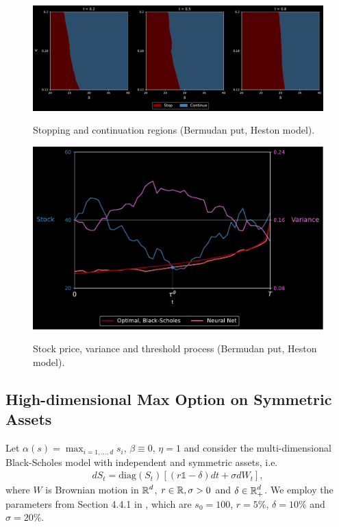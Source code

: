 \begin{figure}[t]
    \centering
     \caption{Stopping and continuation regions (Bermudan put, Heston model).}
    \includegraphics[scale = 0.42]{Figures/2DPlotHestonWide.pdf}
    \label{fig:heston1}
\end{figure}


\begin{figure}[t]
    \centering
     \caption{Stock price, variance and threshold process (Bermudan put, Heston model).}
    \includegraphics[scale = 0.42]{Figures/BdryHeston2.pdf}
    \label{fig:heston2}
\end{figure}


\subsection{High-dimensional Max Option on Symmetric Assets}\label{sec:maxCallSym}
Let $\alpha(s) = \max_{i=1,...,d}s_i$, $\beta\equiv 0$, $\eta=1$ and consider the multi-dimensional Black-Scholes model with independent and symmetric assets, i.e. 
\begin{align}\label{eq:BSAsym}
    d S_t = \text{diag}(S_t) \left[ (r\mathds{1} - \delta)dt + \sigma dW_t\right],
\end{align}
where $W$ is Brownian motion in $\operatorname{\mathbb{R}}^d$, $r \in \operatorname{\mathbb{R}} ,\sigma > 0$ and $\delta \in \operatorname{\mathbb{R}}_+^d$. We employ the parameters from Section 4.4.1 in \cite{Becker2}, which are $s_0 =100 $, $r=5\%$, $\delta =10\%$ and $\sigma = 20 \%$. 

